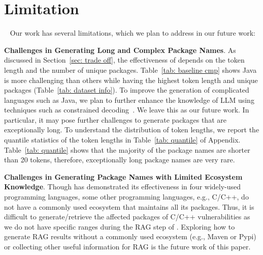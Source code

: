

\section{Limitation}~\label{sec: limitation}
Our work has several limitations, which we plan to address in our future work:

\noindent \textbf{Challenges in Generating Long and Complex Package Names}. 
As discussed in Section~\ref{sec: trade off}, the effectiveness of \detector{} depends on the token length and the number of unique packages.
Table~\ref{tab: baseline cmp} shows Java is more challenging than others while having the highest token length and unique packages (Table~\ref{tab: dataset info}). 
To improve the generation of complicated languages such as Java, we plan to further enhance the knowledge of LLM using techniques such as constrained decoding~\cite{post-vilar-2018-fast}. We leave this as our future work.
In particular, it may pose further challenges to generate packages that are exceptionally long. To understand the distribution of token lengths, we report the quantile statistics of the token lengths in Table~\ref{tab: quantile} of Appendix. Table~\ref{tab: quantile} shows that the majority of the package names are shorter than 20 tokens, therefore, exceptionally long package names are very rare. 

\noindent \textbf{Challenges in Generating Package Names with Limited Ecosystem Knowledge}. 
Though \detector{} has demonstrated its effectiveness in four widely-used programming languages, some other programming languages, e.g., C/C++, do not have a commonly used ecosystem that maintains all its packages.
Thus, it is difficult to generate/retrieve the affected packages of C/C++ vulnerabilities as we do not have specific ranges during the RAG step of \detector{}.
Exploring how to generate RAG results without a commonly used ecosystem (e.g., Maven or Pypi) or collecting other useful information for RAG is the future work of this paper.

